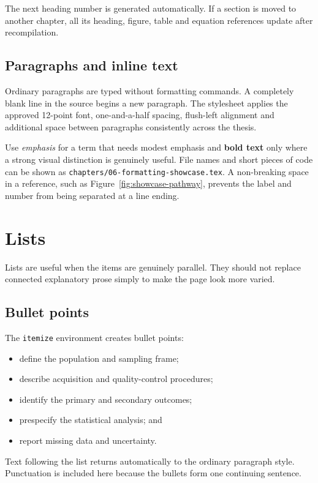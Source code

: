 The next heading number is generated automatically. If a section is moved to
another chapter, all its heading, figure, table and equation references update
after recompilation.

\subsection{Paragraphs and inline text}

Ordinary paragraphs are typed without formatting commands. A completely blank
line in the source begins a new paragraph. The stylesheet applies the approved
12-point font, one-and-a-half spacing, flush-left alignment and additional
space between paragraphs consistently across the thesis.

Use \emph{emphasis} for a term that needs modest emphasis and
\textbf{bold text} only where a strong visual distinction is genuinely useful.
File names and short pieces of code can be shown as
\texttt{chapters/06-formatting-showcase.tex}. A non-breaking space in a
reference, such as Figure~\ref{fig:showcase-pathway}, prevents the label and
number from being separated at a line ending.

\section{Lists}

Lists are useful when the items are genuinely parallel. They should not replace
connected explanatory prose simply to make the page look more varied.

\subsection{Bullet points}

The \texttt{itemize} environment creates bullet points:

\begin{itemize}
  \item define the population and sampling frame;
  \item describe acquisition and quality-control procedures;
  \item identify the primary and secondary outcomes;
  \item prespecify the statistical analysis; and
  \item report missing data and uncertainty.
\end{itemize}

Text following the list returns automatically to the ordinary paragraph style.
Punctuation is included here because the bullets form one continuing sentence.

